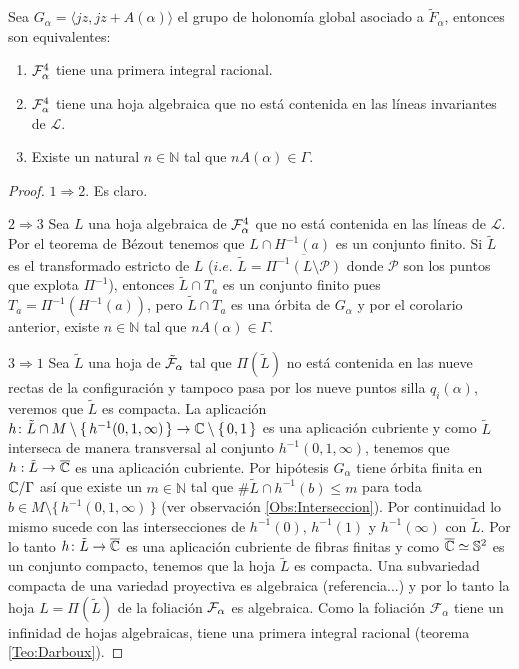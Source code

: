 \begin{Proposicion}
\label{Prop:EquivalenciasIntegrabilidad}
Sea $G_{\alpha}=\langle jz,jz+A(\alpha)\rangle$ el grupo de holonomía global asociado a $\tilde{F}_{\alpha}$, entonces son equivalentes:
\begin{enumerate}
\item $\mathcal{F}_{\alpha}^{4}$ tiene una primera integral racional.
\item $\mathcal{F}_{\alpha}^{4}$ tiene una hoja algebraica que no está contenida en las líneas invariantes de $\mathcal{L}$.
\item Existe un natural $n\in\mathbb{N}$ tal que $nA(\alpha)\in\Gamma$.
\end{enumerate}
\end{Proposicion} 
\begin{proof}
$1\Rightarrow 2$. Es claro.

\noindent $2\Rightarrow 3$ Sea $L$ una hoja algebraica de $\mathcal{F}_{\alpha}^{4}$ que no está contenida en las líneas de $\mathcal{L}$. Por el teorema de Bézout tenemos que $L\cap H^{-1}(a)$ es un conjunto finito. Si $\tilde{L}$ es el transformado estricto de $L$ ($\mathit{i.e.}$ $\tilde{L}=\overline{\Pi^{-1}(L\setminus\mathcal{P})}$ donde $\mathcal{P}$ son los puntos que explota $\Pi^{-1}$), entonces $\tilde{L}\cap T_{a}$ es un conjunto finito pues $T_{a}=\Pi^{-1}(H^{-1}(a))$, pero $\tilde{L}\cap T_{a}$ es una órbita de $G_{\alpha}$ y por el corolario anterior, existe $n\in\mathbb{N}$ tal que $nA(\alpha)\in\Gamma$.

\noindent $3\Rightarrow 1$ Sea $\tilde{L}$ una hoja de $\tilde{\mathcal{F}}_{\alpha}$ tal que $\Pi(\tilde{L})$ no está contenida en las nueve rectas de la configuración y tampoco pasa por los nueve puntos silla $q_{i}(\alpha)$, veremos que $\tilde{L}$ es compacta. La aplicación $h\colon\tilde{L}\cap M\setminus\{\, h^{-1}(0,1,\infty)\,\}\rightarrow\mathbb{C}\setminus \{\, 0,1 \, \}$ es una aplicación cubriente y como $\tilde{L}$ interseca de manera transversal al conjunto $h^{-1}(0,1,\infty)$, tenemos que $h:\tilde{L}\rightarrow\overline{\mathbb{C}}$ es una aplicación cubriente. Por hipótesis $G_{\alpha}$ tiene órbita finita en $\mathbb{C}/\Gamma$ así que existe un $m\in\mathbb{N}$ tal que $\#\tilde{L}\cap h^{-1}(b)\leq m$ para toda $b\in M\setminus\{\, h^{-1}(0,1,\infty)\,\}$ (ver observación \ref{Obs:Interseccion}). Por continuidad lo mismo sucede con las intersecciones de $h^{-1}(0),\, h^{-1}(1)$ y $h^{-1}(\infty)$ con $\tilde{L}$. Por lo tanto $h\colon\tilde{L}\rightarrow\overline{\mathbb{C}}$ es una aplicación cubriente de fibras finitas y como $\overline{\mathbb{C}}\simeq\mathbb{S}^{2}$ es un conjunto compacto, tenemos que la hoja $\tilde{L}$ es compacta. Una subvariedad compacta de una variedad proyectiva es algebraica (referencia...) y por lo tanto la hoja $L=\Pi(\tilde{L})$ de la foliación $\mathcal{F}_{\alpha}$ es algebraica. Como la foliación $\mathcal{F}_{\alpha}$ tiene un infinidad de hojas algebraicas, tiene una primera integral racional (teorema \ref{Teo:Darboux}).
\end{proof}
